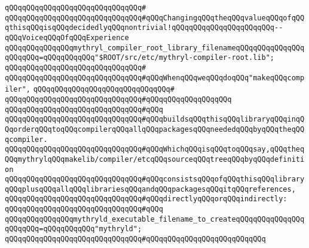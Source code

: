 \verb|qQQqqQQqqQQqqQQqqQQqqQQqqQQqqQQq#|\newline
\verb|qQQqqQQqqQQqqQQqqQQqqQQqqQQqqQQq#qQQqChangingqQQqtheqQQqvalueqQQqofqQQqthisqQQqisqQQqdecidedlyqQQqnontrivial!qQQqqQQqqQQqqQQqqQQqqQQq--qQQqVoiceqQQqOfqQQqExperience|\newline
\newline
\newline
\newline
\newline
\verb|qQQqqQQqqQQqqQQqmythryl_compiler_root_library_filenameqQQqqQQqqQQqqQQqqQQqqQQq=qQQqqQQqqQQq"$ROOT/src/etc/mythryl-compiler-root.lib";|\newline
\verb|qQQqqQQqqQQqqQQqqQQqqQQqqQQqqQQq#|\newline
\verb|qQQqqQQqqQQqqQQqqQQqqQQqqQQqqQQq#qQQqWhenqQQqweqQQqdoqQQq"makeqQQqcompiler",|\newline
\verb|qQQqqQQqqQQqqQQqqQQqqQQqqQQqqQQq#|\newline
\verb|qQQqqQQqqQQqqQQqqQQqqQQqqQQqqQQq#qQQqqQQqqQQqqQQqqQQq|\newline
\verb|qQQqqQQqqQQqqQQqqQQqqQQqqQQqqQQq#qQQq|\newline
\verb|qQQqqQQqqQQqqQQqqQQqqQQqqQQqqQQq#qQQqbuildsqQQqthisqQQqlibraryqQQqinqQQqorderqQQqtoqQQqcompilerqQQqallqQQqpackagesqQQqneededqQQqbyqQQqtheqQQqcompiler.|\newline
\verb|qQQqqQQqqQQqqQQqqQQqqQQqqQQqqQQq#qQQqWhichqQQqisqQQqtoqQQqsay,qQQqtheqQQqmythrylqQQqmakelib/compiler/etcqQQqsourceqQQqtreeqQQqbyqQQqdefinition|\newline
\verb|qQQqqQQqqQQqqQQqqQQqqQQqqQQqqQQq#qQQqconsistsqQQqofqQQqthisqQQqlibraryqQQqplusqQQqallqQQqlibrariesqQQqandqQQqpackagesqQQqitqQQqreferences,|\newline
\verb|qQQqqQQqqQQqqQQqqQQqqQQqqQQqqQQq#qQQqdirectlyqQQqorqQQqindirectly:|\newline
\verb|qQQqqQQqqQQqqQQqqQQqqQQqqQQqqQQq#qQQq|\newline
\newline
\newline
\newline
\verb|qQQqqQQqqQQqqQQqmythryld_executable_filename_to_createqQQqqQQqqQQqqQQqqQQqqQQq=qQQqqQQqqQQq"mythryld";|\newline
\verb|qQQqqQQqqQQqqQQqqQQqqQQqqQQqqQQq#qQQqqQQqqQQqqQQqqQQqqQQqqQQq|\newline
